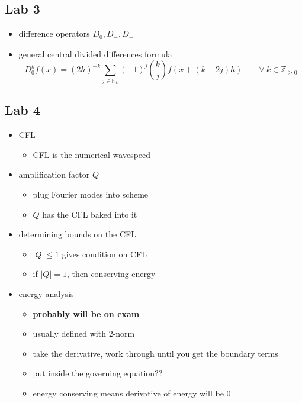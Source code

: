 \documentclass[
]{article}
\providecommand{\tightlist}{%
  \setlength{\itemsep}{0pt}\setlength{\parskip}{0pt}}
\begin{document}
\hypertarget{lab-3}{%
\subsection{Lab 3}\label{lab-3}}

\begin{itemize}
\tightlist
\item
  difference operators \(D_0, D_-, D_+\)
\item
  general central divided differences formula \[
        D_0^k f(x) = (2h)^{-k} 
        \sum_{j \in \mathbb{N}_k }
        (-1)^j \binom{k}{j}
        f( x + (k - 2j) h)
        \qquad
        \forall \ k \in \mathbb{Z}_{\geq 0} 
    \]
\end{itemize}

\hypertarget{lab-4}{%
\subsection{Lab 4}\label{lab-4}}

\begin{itemize}
\tightlist
\item
  CFL

  \begin{itemize}
  \tightlist
  \item
    CFL is the numerical wavespeed
  \end{itemize}
\item
  amplification factor \(Q\)

  \begin{itemize}
  \tightlist
  \item
    plug Fourier modes into scheme
  \item
    \(Q\) has the CFL baked into it
  \end{itemize}
\item
  determining bounds on the CFL

  \begin{itemize}
  \tightlist
  \item
    \(|Q| \leq 1\) gives condition on CFL
  \item
    if \(|Q| = 1\), then conserving energy
  \end{itemize}
\item
  energy analysis

  \begin{itemize}
  \tightlist
  \item
    \textbf{probably will be on exam}
  \item
    usually defined with \(2\)-norm
  \item
    take the derivative, work through until you get the boundary terms
  \item
    put inside the governing equation??
  \item
    energy conserving means derivative of energy will be 0
  \end{itemize}
\end{itemize}
\end{document}
